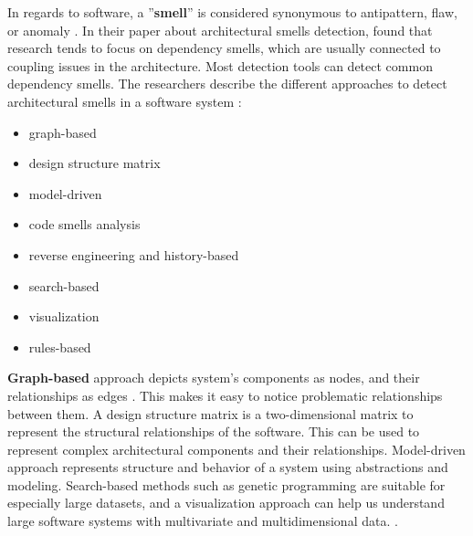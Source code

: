 \documentclass[utf8,english]{gradu3}
\begin{document}
In regards to software, a ''\textbf{smell}'' is considered synonymous to
antipattern, flaw, or anomaly \parencite[1]{Mumtaz2021}. In their paper about
architectural smells detection, \textcite[20]{Mumtaz2021} found that research
tends to focus on dependency smells, which are usually connected
to coupling issues in the architecture. Most
detection tools can detect common dependency smells. The researchers describe the different
approaches to detect architectural smells in a software system
\parencite[8-14]{Mumtaz2021}:
\begin{itemize}
  \item  graph-based
  \item design structure matrix
  \item model-driven
  \item code smells analysis
  \item reverse engineering and history-based
  \item search-based
  \item visualization
  \item rules-based
\end{itemize}

\textbf{Graph-based} approach depicts system's components as nodes, and their
relationships as edges \parencite{Mumtaz2021}. This makes it easy to notice
problematic relationships between them. A design structure matrix is a
two-dimensional matrix to represent the structural relationships of the
software. This can be used to represent complex architectural components and
their relationships. Model-driven approach represents structure and
behavior of a system using abstractions and modeling. Search-based
methods such as genetic programming are suitable for especially large datasets,
and a visualization approach can help us understand large software
systems with multivariate and multidimensional data.
\parencite[9-14]{Mumtaz2021}.
\end{document}
